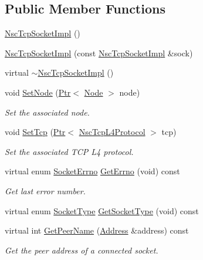 \subsection*{Public Member Functions}
\begin{DoxyCompactItemize}
\item 
\hyperlink{classns3_1_1NscTcpSocketImpl_ac028ebf50b487e57bf28aeda90718234}{Nsc\+Tcp\+Socket\+Impl} ()
\item 
\hyperlink{classns3_1_1NscTcpSocketImpl_a611457e15b01bdd57d3e5fe104da9d6b}{Nsc\+Tcp\+Socket\+Impl} (const \hyperlink{classns3_1_1NscTcpSocketImpl}{Nsc\+Tcp\+Socket\+Impl} \&sock)
\item 
virtual \hyperlink{classns3_1_1NscTcpSocketImpl_afc202f4438699d8af341f4df80edffd3}{$\sim$\+Nsc\+Tcp\+Socket\+Impl} ()
\item 
void \hyperlink{classns3_1_1NscTcpSocketImpl_a2079c359e79399afe7e3ef2cc4cd16d0}{Set\+Node} (\hyperlink{classns3_1_1Ptr}{Ptr}$<$ \hyperlink{classns3_1_1Node}{Node} $>$ node)
\begin{DoxyCompactList}\small\item\em Set the associated node. \end{DoxyCompactList}\item 
void \hyperlink{classns3_1_1NscTcpSocketImpl_a7ce009d3d6f2b9ab86801fd0cc740e3b}{Set\+Tcp} (\hyperlink{classns3_1_1Ptr}{Ptr}$<$ \hyperlink{classns3_1_1NscTcpL4Protocol}{Nsc\+Tcp\+L4\+Protocol} $>$ tcp)
\begin{DoxyCompactList}\small\item\em Set the associated T\+CP L4 protocol. \end{DoxyCompactList}\item 
virtual enum \hyperlink{classns3_1_1Socket_ada1328c5ae0c28cb2a982caf8f6d6cca}{Socket\+Errno} \hyperlink{classns3_1_1NscTcpSocketImpl_a760ff6eb3c21cf6143c51efbc89e98bb}{Get\+Errno} (void) const 
\begin{DoxyCompactList}\small\item\em Get last error number. \end{DoxyCompactList}\item 
virtual enum \hyperlink{classns3_1_1Socket_a698fbcc486a48b7a0d2b0e4ab863d571}{Socket\+Type} \hyperlink{classns3_1_1NscTcpSocketImpl_ab99ff679b0068d5f0a68f819b9f6bb4b}{Get\+Socket\+Type} (void) const 
\item 
virtual int \hyperlink{classns3_1_1NscTcpSocketImpl_a88aa452734b874bd2115785ca9728642}{Get\+Peer\+Name} (\hyperlink{classns3_1_1Address}{Address} \&address) const 
\begin{DoxyCompactList}\small\item\em Get the peer address of a connected socket. \end{DoxyCompactList}\item 

\end{DoxyCompactItemize}
